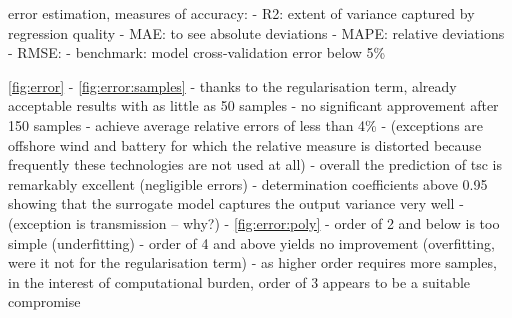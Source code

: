 error estimation, measures of accuracy:
- R2: extent of variance captured by regression quality
- MAE: to see absolute deviations
- MAPE: relative deviations
- RMSE:
- benchmark: model cross-validation error below 5\% \cite{trondle_trade-offs_2020}

\cref{fig:error}
- \cref{fig:error:samples}
  - thanks to the regularisation term, already acceptable results with as little as 50 samples
  - no significant approvement after 150 samples
  - achieve average relative errors of less than 4\%
  - (exceptions are offshore wind and battery for which the relative measure is distorted because frequently these technologies are not used at all)
  - overall the prediction of tsc is remarkably excellent (negligible errors)
  - determination coefficients above 0.95 showing that the surrogate model captures the output variance very well
  - (exception is transmission -- why?)
- \cref{fig:error:poly}
  - order of 2 and below is too simple (underfitting)
  - order of 4 and above yields no improvement (overfitting, were it not for the regularisation term)
  - as higher order requires more samples, in the interest of computational burden, order of 3 appears to be a suitable compromise
